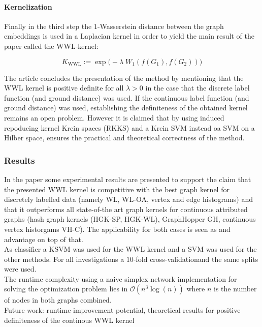 \documentclass[twoside]{scrartcl}
\begin{document}
\paragraph{Kernelization}
Finally in the third step the $1$-Wasserstein distance between the graph embeddings is used in a Laplacian kernel %
in order to yield the main result of the paper called the WWL-kernel:

\[ K_{\text{WWL}} := \exp\Big( -\lambda\; W_1(f(G_1), f(G_2)) \Big) \]

The article concludes the presentation of the method by mentioning that the WWL kernel is positive definite for all $\lambda >0$ in the case that the discrete label function (and ground distance) was used. If the continuous label function (and ground distance) was used, establishing the definiteness of the obtained kernel remains an open problem. %
However it is claimed that by using induced repoducing kernel Krein spaces (RKKS) and a Krein SVM instead oa SVM on a Hilber space, ensures the practical and theoretical correctness of the method.

\subsubsection{Results}
In the paper some experimental results are presented to support the claim that the presented WWL kernel is competitive with the best graph kernel for discretely labelled data (namely WL, WL-OA, vertex and edge histograms) and that it outperforms all state-of-the art graph kernels for continuous attributed graphs (hash graph kernels (HGK-SP, HGK-WL), GraphHopper GH, continuous vertex historgams VH-C). The applicability for both cases is seen as and advantage on top of that.\\ %

As classifier a KSVM was used for the WWL kernel and a SVM was used for the other methods. For all investigations a $10$-fold cross-validationand the same splits were used. \\

The runtime complexity using a naive simplex network implementation for solving the optimization problem lies in $\mathcal{O}(n^3 \log(n))$ where $n$ is the number of nodes in both graphs combined.\\

Future work: runtime improvement potential, theoretical results for positive definiteness of the continous WWL kernel
\end{document}
